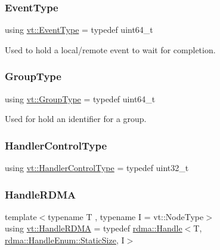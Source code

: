 \mbox{\label{namespacevt_a009267401def7ae8bf201892222d060f}} 
\subsubsection{\texorpdfstring{Event\+Type}{EventType}}
{\footnotesize\ttfamily using \hyperlink{namespacevt_a009267401def7ae8bf201892222d060f}{vt\+::\+Event\+Type} = typedef uint64\+\_\+t}



Used to hold a local/remote event to wait for completion. 

\mbox{\label{namespacevt_a27b5e4411c9b6140c49100e050e2f743}} 
\subsubsection{\texorpdfstring{Group\+Type}{GroupType}}
{\footnotesize\ttfamily using \hyperlink{namespacevt_a27b5e4411c9b6140c49100e050e2f743}{vt\+::\+Group\+Type} = typedef uint64\+\_\+t}



Used for hold an identifier for a group. 

\mbox{\label{namespacevt_adbbef13b92f0a93b14c219b7cc8a48f2}} 
\subsubsection{\texorpdfstring{Handler\+Control\+Type}{HandlerControlType}}
{\footnotesize\ttfamily using \hyperlink{namespacevt_adbbef13b92f0a93b14c219b7cc8a48f2}{vt\+::\+Handler\+Control\+Type} = typedef uint32\+\_\+t}

\mbox{\label{namespacevt_abc3449a4b87363b942453d0b8cc18a7d}} 
\subsubsection{\texorpdfstring{Handle\+R\+D\+MA}{HandleRDMA}}
{\footnotesize\ttfamily template$<$typename T , typename I  = vt\+::\+Node\+Type$>$ \\
using \hyperlink{namespacevt_abc3449a4b87363b942453d0b8cc18a7d}{vt\+::\+Handle\+R\+D\+MA} = typedef \hyperlink{structvt_1_1rdma_1_1_handle}{rdma\+::\+Handle}$<$T, \hyperlink{namespacevt_1_1rdma_a0234ff19cfb3c04718cfdfd36b2d6d88a0c5c41d6a0319a61d3a5e8a060b7c4d7}{rdma\+::\+Handle\+Enum\+::\+Static\+Size}, I$>$}

